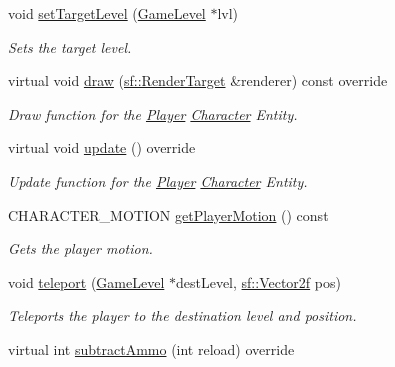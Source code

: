 \begin{DoxyCompactItemize}
void \mbox{\hyperlink{class_player_a1741bd5781fda587c31ec63851ecf41d}{set\+Target\+Level}} (\mbox{\hyperlink{class_game_level}{Game\+Level}} $\ast$lvl)
\begin{DoxyCompactList}\small\item\em Sets the target level. \end{DoxyCompactList}\item 
virtual void \mbox{\hyperlink{class_player_aa89ab3b084fe95cb2f83e34b8163b126}{draw}} (\mbox{\hyperlink{classsf_1_1_render_target}{sf\+::\+Render\+Target}} \&renderer) const override
\begin{DoxyCompactList}\small\item\em Draw function for the \mbox{\hyperlink{class_player}{Player}} \mbox{\hyperlink{class_character}{Character}} Entity. \end{DoxyCompactList}\item 
\mbox{\label{class_player_a6912bb6e48efb5845d59f0f4582827ef}} 
virtual void \mbox{\hyperlink{class_player_a6912bb6e48efb5845d59f0f4582827ef}{update}} () override
\begin{DoxyCompactList}\small\item\em Update function for the \mbox{\hyperlink{class_player}{Player}} \mbox{\hyperlink{class_character}{Character}} Entity. \end{DoxyCompactList}\item 
\mbox{\label{class_player_aa7c13e2dcf92c1517b191920ed24a18e}} 
C\+H\+A\+R\+A\+C\+T\+E\+R\+\_\+\+M\+O\+T\+I\+ON \mbox{\hyperlink{class_player_aa7c13e2dcf92c1517b191920ed24a18e}{get\+Player\+Motion}} () const
\begin{DoxyCompactList}\small\item\em Gets the player motion. \end{DoxyCompactList}\item 
void \mbox{\hyperlink{class_player_a996ad04a50f527ad469ab63059eae6c5}{teleport}} (\mbox{\hyperlink{class_game_level}{Game\+Level}} $\ast$dest\+Level, \mbox{\hyperlink{classsf_1_1_vector2}{sf\+::\+Vector2f}} pos)
\begin{DoxyCompactList}\small\item\em Teleports the player to the destination level and position. \end{DoxyCompactList}\item 
virtual int \mbox{\hyperlink{class_player_aeadfd36dc48aea300e4925b8c8f3bd3f}{subtract\+Ammo}} (int reload) override

\end{DoxyCompactItemize}

